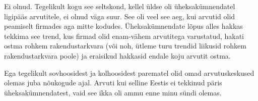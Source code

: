 Ei olnud. Tegelikult kogu see seltskond, kellel üldse oli üheksakümnendatel ligipääs arvutitele, ei olnud väga suur. See oli veel see aeg, kui arvutid olid peamiselt firmades aga mitte kodudes. Üheksakümnendate lõpus alles hakkas tekkima see trend, kus firmad olid enam-vähem arvutitega varustatud, hakati ostma rohkem rakendustarkvara (või noh, ütleme turu trendid liikusid rohkem rakendustarkvara poole) ja eraisikud hakkasid endale koju arvutit ostma.


Ega tegelikult  sovhoosidest ja kolhoosidest parematel olid omad arvutuskeskused olemas juba nõukogude ajal. Arvuti kui selline Eestis ei tekkinud päris üheksakümnendatest, vaid see ikka oli ammu enne minu sündi olemas. 
